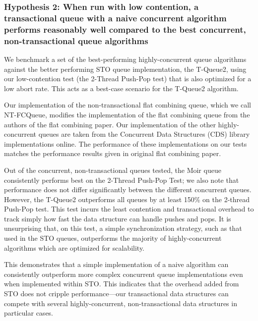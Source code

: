 \vspace{12pt}
\noindent{}

\subsubsection{Hypothesis 2: When run with low contention, a transactional queue with a naive concurrent algorithm performs reasonably well compared to the best concurrent, non-transactional queue algorithms}

We benchmark a set of the best-performing highly-concurrent queue algorithms against the better performing STO queue implementation, the T-Queue2, using our low-contention test (the 2-Thread Push-Pop test) that is also optimized for a low abort rate. This acts as a best-case scenario for the T-Queue2 algorithm.

Our implementation of the non-transactional flat combining queue, which we call NT-FCQueue, modifies the implementation of the flat combining queue from the authors of the flat combining paper\cite{flatcombining}. Our implementation of the other highly-concurrent queues are taken from the Concurrent Data Structures (CDS) library implementations online\cite{libcds}. The performance of these implementations on our tests matches the performance results given in original flat combining paper. 

Out of the concurrent, non-transactional queues tested, the Moir queue\cite{queue2} consistently performs best on the 2-Thread Push-Pop Test; we also note that performance does not differ significantly between the different concurrent queues. However, the T-Queue2 outperforms all queues by at least 150\% on the 2-thread Push-Pop test. This test incurs the least contention and transactional overhead to track simply how fast the data structure can handle pushes and pops. It is unsurprising that, on this test, a simple synchronization strategy, such as that used in the STO queues, outperforms the majority of highly-concurrent algorithms which are optimized for scalability. 

This demonstrates that a simple implementation of a naive algorithm can consistently outperform more complex concurrent queue implementations even when implemented within STO. This indicates that the overhead added from STO does not cripple performance---our transactional data structures can compete with several highly-concurrent, non-transactional data structures in particular cases. 

